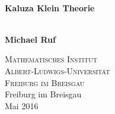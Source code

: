 \begin{titlepage}
\begin{center}
	\HRule \\[0.4cm]
	{ \huge \bfseries Kaluza Klein Theorie}\\
	\HRule \\[0.5cm]
	\begin{flushright}
  		\Large \textbf{Michael Ruf}\\[1cm]
  	\end{flushright}
  \vspace*{\fill}	
  \vspace*{\fill}
  \normalsize
  \textsc{Mathematisches Institut} \\
  \textsc{Albert-Ludwigs-Universität} \\
  \textsc{Freiburg im Breisgau} \\[1cm]
  
  \large Freiburg im Breisgau \\
  Mai 2016
\end{center}
\end{titlepage} 
